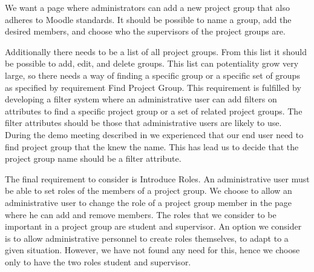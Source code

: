 We want a page where administrators can add a new project group that also adheres to Moodle standards.
It should be possible to name a group, add the desired members, and choose who the supervisors of the project groups are.

Additionally there needs to be a list of all project groups.
From this list it should be possible to add, edit, and delete groups. 
This list can potentiality grow very large, so there needs a way of finding a specific group or a specific set of groups as specified by requirement Find Project Group.
This requirement is fulfilled by developing a filter system where an administrative user can add filters on attributes to find a specific project group or a set of related project groups.
The filter attributes should be those that administrative users are likely to use.
During the demo meeting described in  we experienced that our end user need to find project group that the knew the name.
This has lead us to decide that the project group name should be a filter attribute.

The final requirement to consider is Introduce Roles.
An administrative user must be able to set roles of the members of a project group.
We choose to allow an administrative user to change the role of a project group member in the page where he can add and remove members.
The roles that we consider to be important in a project group are student and supervisor.
An option we consider is to allow administrative personnel to create roles themselves, to adapt to a given situation.
However, we have not found any need for this, hence we choose only to have the two roles student and supervisor.






